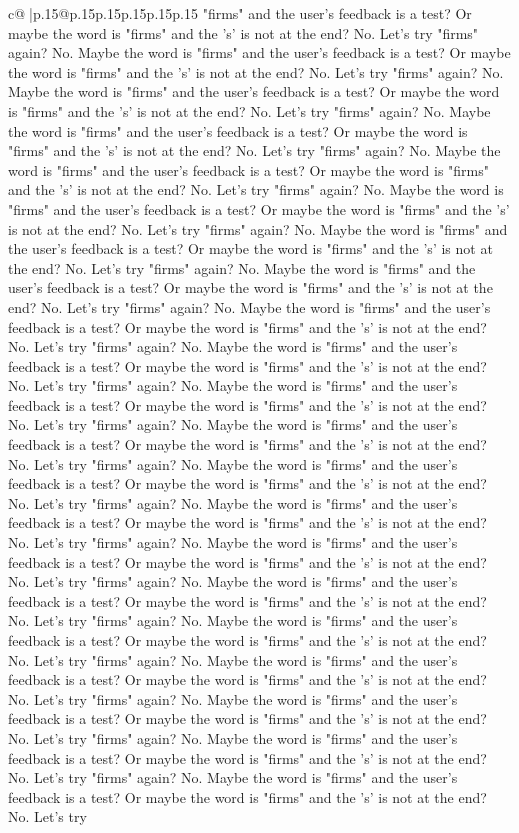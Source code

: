 \documentclass{article}
\begin{document}
{\begin{supertabular}{c@{$\;$}|p{.15\linewidth}@{}p{.15\linewidth}p{.15\linewidth}p{.15\linewidth}p{.15\linewidth}p{.15\linewidth}}
{{{"firms" and the user's feedback is a test? Or maybe the word is "firms" and the 's' is not at the end? No. Let's try "firms" again? No. Maybe the word is "firms" and the user's feedback is a test? Or maybe the word is "firms" and the 's' is not at the end? No. Let's try "firms" again? No. Maybe the word is "firms" and the user's feedback is a test? Or maybe the word is "firms" and the 's' is not at the end? No. Let's try "firms" again? No. Maybe the word is "firms" and the user's feedback is a test? Or maybe the word is "firms" and the 's' is not at the end? No. Let's try "firms" again? No. Maybe the word is "firms" and the user's feedback is a test? Or maybe the word is "firms" and the 's' is not at the end? No. Let's try "firms" again? No. Maybe the word is "firms" and the user's feedback is a test? Or maybe the word is "firms" and the 's' is not at the end? No. Let's try "firms" again? No. Maybe the word is "firms" and the user's feedback is a test? Or maybe the word is "firms" and the 's' is not at the end? No. Let's try "firms" again? No. Maybe the word is "firms" and the user's feedback is a test? Or maybe the word is "firms" and the 's' is not at the end? No. Let's try "firms" again? No. Maybe the word is "firms" and the user's feedback is a test? Or maybe the word is "firms" and the 's' is not at the end? No. Let's try "firms" again? No. Maybe the word is "firms" and the user's feedback is a test? Or maybe the word is "firms" and the 's' is not at the end? No. Let's try "firms" again? No. Maybe the word is "firms" and the user's feedback is a test? Or maybe the word is "firms" and the 's' is not at the end? No. Let's try "firms" again? No. Maybe the word is "firms" and the user's feedback is a test? Or maybe the word is "firms" and the 's' is not at the end? No. Let's try "firms" again? No. Maybe the word is "firms" and the user's feedback is a test? Or maybe the word is "firms" and the 's' is not at the end? No. Let's try "firms" again? No. Maybe the word is "firms" and the user's feedback is a test? Or maybe the word is "firms" and the 's' is not at the end? No. Let's try "firms" again? No. Maybe the word is "firms" and the user's feedback is a test? Or maybe the word is "firms" and the 's' is not at the end? No. Let's try "firms" again? No. Maybe the word is "firms" and the user's feedback is a test? Or maybe the word is "firms" and the 's' is not at the end? No. Let's try "firms" again? No. Maybe the word is "firms" and the user's feedback is a test? Or maybe the word is "firms" and the 's' is not at the end? No. Let's try "firms" again? No. Maybe the word is "firms" and the user's feedback is a test? Or maybe the word is "firms" and the 's' is not at the end? No. Let's try "firms" again? No. Maybe the word is "firms" and the user's feedback is a test? Or maybe the word is "firms" and the 's' is not at the end? No. Let's try "firms" again? No. Maybe the word is "firms" and the user's feedback is a test? Or maybe the word is "firms" and the 's' is not at the end? No. Let's try "firms" again? No. Maybe the word is "firms" and the user's feedback is a test? Or maybe the word is "firms" and the 's' is not at the end? No. Let's try }}}
\end{supertabular}}
\end{document}
